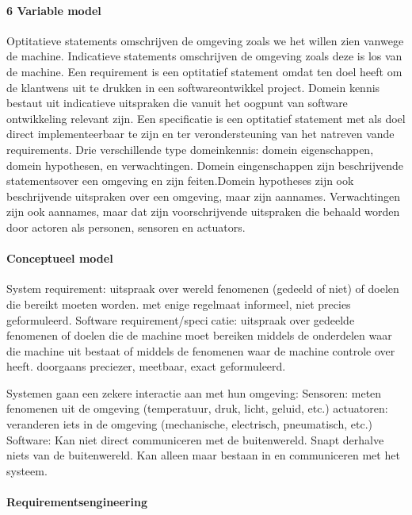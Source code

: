 \paragraph{6 Variable model}
Optitatieve statements omschrijven de omgeving zoals we het willen zien vanwege de machine. 
Indicatieve statements omschrijven de omgeving zoals deze is los van de machine. 
Een requirement is een optitatief statement omdat ten doel heeft om de klantwens uit te drukken in een softwareontwikkel project. 
Domein kennis bestaut uit indicatieve uitspraken die vanuit het oogpunt van software ontwikkeling relevant zijn. 
Een specificatie is een optitatief statement met als doel direct implementeerbaar te zijn en ter verondersteuning van het natreven vande requirements. 
Drie verschillende type domeinkennis: domein eigenschappen, domein hypothesen, en verwachtingen. 
Domein eingenschappen  zijn beschrijvende statementsover een omgeving en zijn feiten.Domein hypotheses  zijn ook beschrijvende uitspraken over een omgeving, maar zijn aannames. 
Verwachtingen zijn ook aannames, maar dat zijn voorschrijvende uitspraken die behaald worden door actoren als personen, sensoren en actuators. 

  
\paragraph{Conceptueel model}



System requirement:
uitspraak over wereld fenomenen (gedeeld of niet) of doelen
die bereikt moeten worden.
met enige regelmaat informeel, niet precies geformuleerd.
Software requirement/specicatie:
uitspraak over gedeelde fenomenen of doelen die de machine
moet bereiken middels de onderdelen waar die machine uit
bestaat of middels de fenomenen waar de machine controle
over heeft.
doorgaans preciezer, meetbaar, exact geformuleerd.


Systemen gaan een zekere interactie aan met hun omgeving:
Sensoren: meten fenomenen uit de omgeving (temperatuur,
druk, licht, geluid, etc.)
actuatoren: veranderen iets in de omgeving (mechanische,
electrisch, pneumatisch, etc.)
Software:
Kan niet direct communiceren met de buitenwereld.
Snapt derhalve niets van de buitenwereld.
Kan alleen maar bestaan in en communiceren met het
systeem.


\paragraph{Requirementsengineering}

